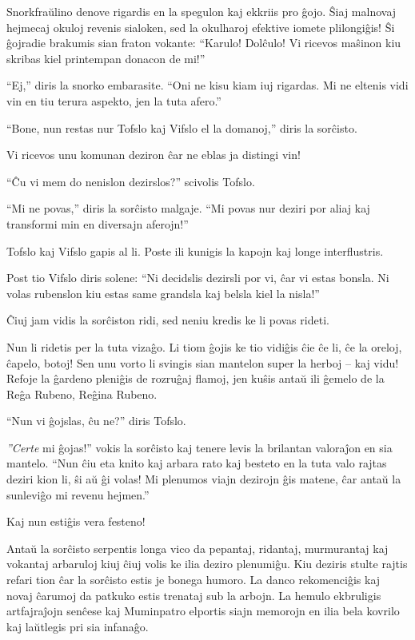 Snorkfraŭlino denove rigardis en la spegulon kaj ekkriis pro ĝojo. Ŝiaj malnovaj hejmecaj okuloj revenis sialoken, sed la okulharoj efektive iomete plilongiĝis! Ŝi ĝojradie brakumis sian fraton vokante: ``Karulo! Dolĉulo! Vi ricevos maŝinon kiu skribas kiel printempan donacon de mi!''

``Ej,'' diris la snorko embarasite. ``Oni ne kisu kiam iuj rigardas. Mi ne eltenis vidi vin en tiu terura aspekto, jen la tuta afero.''

``Bone, nun restas nur Tofslo kaj Vifslo el la domanoj,'' diris la sorĉisto.

Vi ricevos unu komunan deziron ĉar ne eblas ja distingi vin!

``Ĉu vi mem do nenislon dezirslos?'' scivolis Tofslo.

``Mi ne povas,'' diris la sorĉisto malgaje. ``Mi povas nur deziri por aliaj kaj transformi min en diversajn aferojn!''

Tofslo kaj Vifslo gapis al li. Poste ili kunigis la kapojn kaj longe interflustris.

Post tio Vifslo diris solene: ``Ni decidslis dezirsli por vi, ĉar vi estas bonsla. Ni volas rubenslon kiu estas same grandsla kaj belsla kiel la nisla!''

Ĉiuj jam vidis la sorĉiston ridi, sed neniu kredis ke li povas rideti.

Nun li ridetis per la tuta vizaĝo. Li tiom ĝojis ke tio vidiĝis ĉie ĉe li, ĉe la oreloj, ĉapelo, botoj! Sen unu vorto li svingis sian mantelon super la herboj -- kaj vidu! Refoje la ĝardeno pleniĝis de rozruĝaj flamoj, jen kuŝis antaŭ ili ĝemelo de la Reĝa Rubeno, Reĝina Rubeno.

``Nun vi ĝojslas, ĉu ne?'' diris Tofslo.

\emph{''Certe} mi ĝojas!'' vokis la sorĉisto kaj tenere levis la brilantan valoraĵon en sia mantelo. ``Nun ĉiu eta knito kaj arbara rato kaj besteto en la tuta valo rajtas deziri kion li, ŝi aŭ ĝi volas! Mi plenumos viajn dezirojn ĝis matene, ĉar antaŭ la sunleviĝo mi revenu hejmen.''

Kaj nun estiĝis vera festeno!

Antaŭ la sorĉisto serpentis longa vico da pepantaj, ridantaj, murmurantaj kaj vokantaj arbaruloj kiuj ĉiuj volis ke ilia deziro plenumiĝu. Kiu deziris stulte rajtis refari tion ĉar la sorĉisto estis je bonega humoro. La danco rekomenciĝis kaj novaj ĉarumoj da patkuko estis trenataj sub la arbojn. La hemulo ekbruligis artfajraĵojn senĉese kaj Muminpatro elportis siajn memorojn en ilia bela kovrilo kaj laŭtlegis pri sia infanaĝo.

